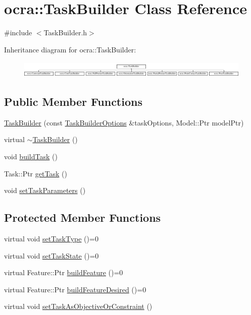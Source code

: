 \hypertarget{classocra_1_1TaskBuilder}{}\section{ocra\+:\+:Task\+Builder Class Reference}
\label{classocra_1_1TaskBuilder}


{\ttfamily \#include $<$Task\+Builder.\+h$>$}

Inheritance diagram for ocra\+:\+:Task\+Builder\+:\begin{figure}[H]
\begin{center}
\leavevmode
\includegraphics[height=0.812183cm]{d6/d6a/classocra_1_1TaskBuilder}
\end{center}
\end{figure}
\subsection*{Public Member Functions}
\begin{DoxyCompactItemize}
\item 
\hyperlink{classocra_1_1TaskBuilder_a47da2d3a4f793620895f5eda79ea80f6}{Task\+Builder} (const \hyperlink{classocra_1_1TaskBuilderOptions}{Task\+Builder\+Options} \&task\+Options, Model\+::\+Ptr model\+Ptr)
\item 
virtual \hyperlink{classocra_1_1TaskBuilder_ac4a6e94f7e39db652819ebbd99e2a334}{$\sim$\+Task\+Builder} ()
\item 
void \hyperlink{classocra_1_1TaskBuilder_a84109a9bca0da0b2f7220b183e7d032d}{build\+Task} ()
\item 
Task\+::\+Ptr \hyperlink{classocra_1_1TaskBuilder_a31a863f23c736bcfa9f1f4c5e24d4859}{get\+Task} ()
\item 
void \hyperlink{classocra_1_1TaskBuilder_a646ca4a01affbb2aa82cfdde32e8be66}{set\+Task\+Parameters} ()
\end{DoxyCompactItemize}
\subsection*{Protected Member Functions}
\begin{DoxyCompactItemize}
\item 
virtual void \hyperlink{classocra_1_1TaskBuilder_a1a979fc495be6dc30483aa8fd0ff2650}{set\+Task\+Type} ()=0
\item 
virtual void \hyperlink{classocra_1_1TaskBuilder_a7b44bfa101566ea4400e2d9bfdb9ff32}{set\+Task\+State} ()=0
\item 
virtual Feature\+::\+Ptr \hyperlink{classocra_1_1TaskBuilder_a58c0dc416a9607a344a080248ee26ac2}{build\+Feature} ()=0
\item 
virtual Feature\+::\+Ptr \hyperlink{classocra_1_1TaskBuilder_a7a2c8bcc5d95160d0e48806a2648f1a5}{build\+Feature\+Desired} ()=0
\item 
virtual void \hyperlink{classocra_1_1TaskBuilder_a9e7588983e3adf7f706d122a75e84d05}{set\+Task\+As\+Objective\+Or\+Constraint} ()
\end{DoxyCompactItemize}
